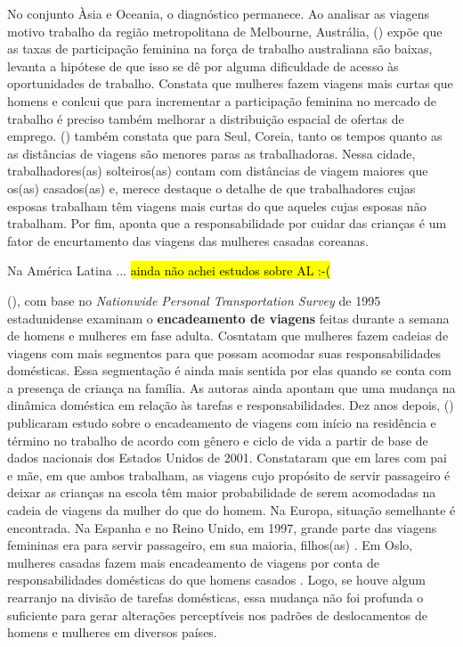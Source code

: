 No conjunto Àsia e Oceania, o diagnóstico permanece.
Ao analisar as viagens motivo trabalho da região metropolitana de Melbourne, Austrália,  (\citeyear{HOWE1982}) expõe que as taxas de participação feminina na força de trabalho australiana são baixas, levanta a hipótese de que isso se dê por alguma dificuldade de acesso às oportunidades de trabalho. Constata que mulheres fazem viagens mais curtas que homens e conlcui que para incrementar a participação feminina no mercado de trabalho é preciso também melhorar a distribuição espacial de ofertas de emprego.
 (\citeyear{SONG2003}) também constata que para Seul, Coreia, tanto os tempos quanto as as distâncias de viagens são menores paras as trabalhadoras. Nessa cidade, trabalhadores(as) solteiros(as) contam com distâncias de viagem maiores que os(as) casados(as) e, merece destaque o detalhe de que trabalhadores cujas esposas trabalham têm viagens mais curtas do que aqueles cujas esposas não trabalham. Por fim,  aponta que a responsabilidade por cuidar das crianças é um fator de encurtamento das viagens das mulheres casadas coreanas.

Na América Latina ... \hl{ainda não achei estudos sobre AL :-( }





 (\citeyear{MCGUCKIN1995}), com base no  \emph{Nationwide Personal Transportation Survey} de 1995 estadunidense examinam o \textbf{encadeamento de viagens} feitas durante a semana de homens e mulheres em fase adulta. Cosntatam que mulheres fazem cadeias de viagens com mais segmentos para que possam acomodar suas responsabilidades domésticas. Essa segmentação é ainda mais sentida por elas quando se conta com a presença de criança na família. As autoras ainda apontam que uma mudança na dinâmica doméstica em relação às tarefas e responsabilidades.
Dez anos depois,  (\citeyear{MCNUCKIN2005}) publicaram estudo sobre o encadeamento de viagens com início na residência e término no trabalho de acordo com gênero e ciclo de vida a partir de base de dados nacionais dos Estados Unidos de 2001. Constataram que em lares com pai e mãe, em que ambos trabalham, as viagens cujo propósito de servir passageiro é deixar as crianças na escola têm maior probabilidade de serem acomodadas na cadeia de viagens da mulher do que do homem.
Na Europa, situação semelhante é encontrada. Na Espanha e no Reino Unido, em 1997, grande parte das viagens femininas era para servir passageiro, em sua maioria, filhos(as) \cite{ROOT1999}. 
Em Oslo, mulheres casadas fazem mais encadeamento de viagens por conta de responsabilidades domésticas do que homens casados \cite{HJORTHOL2000}.
Logo, se houve algum rearranjo na divisão de tarefas domésticas, essa mudança não foi profunda o suficiente para gerar alterações perceptíveis nos padrões de deslocamentos de homens e mulheres em diversos países.



